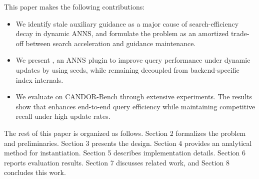 This paper makes the following contributions:
\begin{itemize}
\item We identify stale auxiliary guidance as a major cause of search-efficiency decay in dynamic ANNS, and formulate the problem as an amortized trade-off between search acceleration and guidance maintenance.
\item We present \system, an ANNS plugin to improve query performance under dynamic updates by using seeds, while remaining decoupled from 
backend-specific index internals.
\item We evaluate \system on CANDOR-Bench through extensive experiments. The results show that \system enhances end-to-end query efficiency 
while maintaining competitive recall under high update rates.
\end{itemize}

The rest of this paper is organized as follows.
Section 2 formalizes the problem and preliminaries.
Section 3 presents the \system design.
Section 4 provides an analytical method for \system instantiation.
Section 5 describes implementation details.
Section 6 reports evaluation results.
Section 7 discusses related work, and Section 8 concludes this work.
